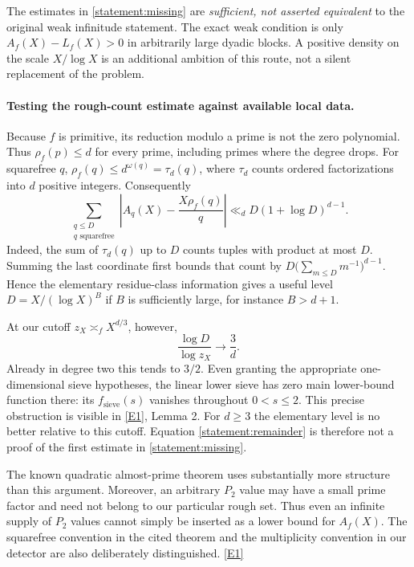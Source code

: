 \documentclass[11pt]{article}
\newcommand{\eref}[2]{\hyperlink{extra:#1:#2}{[E#2]}}
\begin{document}
The estimates in \eqref{statement:missing} are \emph{sufficient, not asserted
equivalent} to the original weak infinitude statement. The exact weak
condition is only $A_f(X)-L_f(X)>0$ in arbitrarily large dyadic blocks.
A positive density on the scale $X/\log X$ is an additional ambition of this
route, not a silent replacement of the problem.

\paragraph{Testing the rough-count estimate against available local data.}
Because $f$ is primitive, its reduction modulo a prime is not the zero
polynomial. Thus $\rho_f(p)\le d$ for every prime, including primes where
the degree drops. For squarefree $q$,
$\rho_f(q)\le d^{\omega(q)}=\tau_d(q)$, where $\tau_d$ counts ordered
factorizations into $d$ positive integers. Consequently
\begin{equation}\label{statement:remainder}
 \sum_{\substack{q\le D\\q\text{ squarefree}}}
 \left|A_q(X)-\frac{X\rho_f(q)}q\right|
 \ll_d D(1+\log D)^{d-1}.
\end{equation}
Indeed, the sum of $\tau_d(q)$ up to $D$ counts tuples with product at most
$D$. Summing the last coordinate first bounds that count by
$D\bigl(\sum_{m\le D}m^{-1}\bigr)^{d-1}$.
Hence the elementary residue-class information gives a useful level
$D=X/(\log X)^B$ if $B$ is sufficiently large, for instance $B>d+1$.

At our cutoff $z_X\asymp_f X^{d/3}$, however,
\[
 \frac{\log D}{\log z_X}\longrightarrow\frac3d.
\]
Already in degree two this tends to $3/2$. Even granting the appropriate
one-dimensional sieve hypotheses, the linear lower sieve has zero main
lower-bound function there: its $f_{\mathrm{sieve}}(s)$ vanishes throughout
$0<s\le2$. This precise obstruction is visible in \eref{statement}{1}, Lemma 2.
For $d\ge3$ the elementary level is no better relative to this cutoff.
Equation \eqref{statement:remainder} is therefore not a proof of the first
estimate in \eqref{statement:missing}.

The known quadratic almost-prime theorem uses substantially more structure
than this argument. Moreover, an arbitrary $P_2$ value may have a small
prime factor and need not belong to our particular rough set. Thus even an
infinite supply of $P_2$ values cannot simply be inserted as a lower bound
for $A_f(X)$. The squarefree convention in the cited theorem and the
multiplicity convention in our detector are also deliberately distinguished.
\eref{statement}{1}
\end{document}
